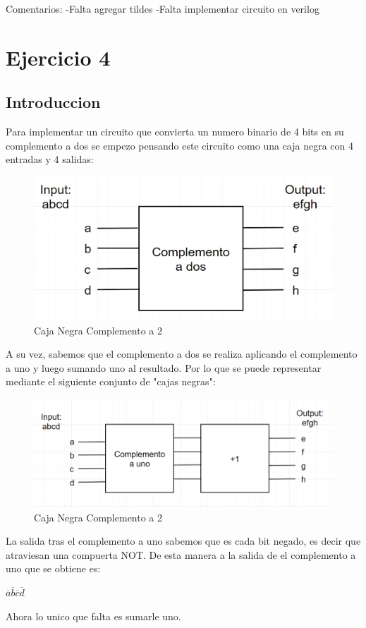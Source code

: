 	Comentarios:
	\newline -Falta agregar tildes
	\newline -Falta implementar circuito en verilog
	\section{Ejercicio 4}
	\subsection{Introduccion}
		\hspace{10mm} Para implementar un circuito que convierta un numero binario de 4 bits en su complemento a dos se empezo pensando este circuito como una caja negra con 4 entradas y 4 salidas:
		\begin{figure}[h!]
			\includegraphics[width=\linewidth,scale=0.5]{ejercicios/Ej4/comp2.png}
  			\caption{Caja Negra Complemento a 2}
		\end{figure}
		\newline \hspace{10mm} A su vez, sabemos que el complemento a dos se realiza aplicando el complemento a uno y luego sumando uno al resultado. Por lo que se puede representar mediante el siguiente conjunto de "cajas negras":
		\begin{figure}[h!]
			\includegraphics[width=\linewidth,scale=0.5]{ejercicios/Ej4/comp1+1.png}
  			\caption{Caja Negra Complemento a 2}
		\end{figure}
		\newline \hspace{10mm} La salida tras el complemento a uno sabemos que es cada bit negado, es decir que atraviesan una compuerta NOT. De esta manera a la salida de el complemento a uno que se obtiene es: 
		\newline \centerline{$\overline{a} \overline{b} \overline{c} \overline{d}$} 
		\hspace{10mm} Ahora lo unico que falta es sumarle uno.
